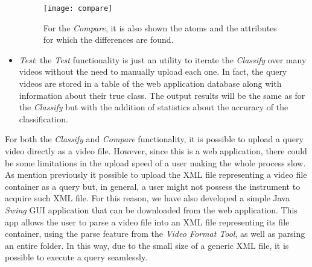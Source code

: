 \begin{itemize}
\begin{figure}
  \centering
  \texttt{[image: compare]}
  \caption{For the \emph{Compare}, it is also shown the atoms and the attributes for which the differences are found.}\label{fig:compare}
\end{figure}

\item \emph{Test}: the \emph{Test} functionality is just an utility to iterate the \emph{Classify} over many videos without the need to manually upload each one. In fact, the query videos are stored in a table of the web application database along with information about their true class. The output results will be the same as for the \emph{Classify} but with the addition of statistics about the accuracy of the classification.

\end{itemize}

For both the \emph{Classify} and \emph{Compare} functionality, it is possible to upload a query video directly as a video file. However, since this is a web application, there could be some limitations in the upload speed of a user making the whole process slow. As mention previously it possible to upload the XML file representing a video file container as a query but, in general, a user might not possess the instrument to acquire such XML file. For this reason, we have also developed a simple Java \emph{Swing} GUI application that can be downloaded from the web application. This app allows the user to parse a video file into an XML file representing its file container, using the parse feature from the \emph{Video Format Tool}, as well as parsing an entire folder. In this way, due to the small size of a generic XML file, it is possible to execute a query seamlessly.